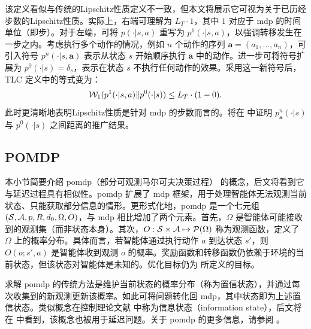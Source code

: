 该定义看似与传统的Lipschitz性质定义不一致，但本文将展示它可视为关于已历经步数的Lipschitz性质。实际上，右端可理解为 $L_T\cdot 1$，其中 $1$ 对应于 \gls{mdp} 的时间单位（即步）。对于左端，可将 $p(\cdot\vert s,a)$ 重写为 $p^1(\cdot\vert s,a)$，以强调转移发生在一步之内。考虑执行多个动作的情况，例如 $n$ 个动作的序列 $\boldsymbol a=(a_1,\dots,a_n)$，可引入符号 $p^n(\cdot\vert s,\boldsymbol a)$ 表示从状态 $s$ 开始顺序执行 $\boldsymbol a$ 中的动作。进一步可将符号扩展为 $p^0(\cdot\vert s)=\delta_s$，表示在状态 $s$ 不执行任何动作的效果。采用这一新符号后，TLC 定义中的等式变为：
\begin{align*}
    \wassersteindistance[1](p^1(\cdot\vert s,a)\Vert p^0(\cdot\vert s))\le L_T\cdot (1-0).
\end{align*}
此时更清晰地表明Lipschitz性质是针对 \gls{mdp} 的步数而言的。将在  中证明 $p_{\boldsymbol a}^n(\cdot\vert s)$ 与 $p^0(\cdot\vert s)$ 之间距离的推广结果。


\subsection{POMDP}
\label{subsec:pomdp}

本小节简要介绍 \gls{pomdp}（部分可观测马尔可夫决策过程）\cite{kaelbling1998planning} 的概念，后文将看到它与延迟过程具有相似性。\gls{pomdp} 扩展了 \gls{mdp} 框架，用于处理智能体无法观测当前状态、只能获取部分信息的情形。更形式化地，\gls{pomdp} 是一个七元组 $(\statespace,\actionspace, \transitionfunction, \rewardfunction, \initialstatedistribution, \Omega, O)$，与 \gls{mdp} 相比增加了两个元素。首先，$\Omega$ 是智能体可能接收到的观测集（而非状态本身）。其次，$O:\statespace\times\actionspace\mapsto \setofprobability(\Omega)$ 称为观测函数，定义了 $\Omega$ 上的概率分布。具体而言，若智能体通过执行动作 $a$ 到达状态 $s'$，则 $O(o; s',a)$ 是智能体收到观测 $o$ 的概率。奖励函数和转移函数仍依赖于环境的当前状态，但该状态对智能体是未知的。优化目标仍为  所定义的目标。

求解 \gls{pomdp} 的传统方法是维护当前状态的概率分布（称为置信状态），并通过每次收集到的新观测更新该概率。如此可将问题转化回 \gls{mdp}，其中状态即为上述置信状态。类似概念在控制理论文献 \cite{kumar2015stochastic} 中称为信息状态（information state），后文将在  中看到，该概念也被用于延迟问题。关于 \gls{pomdp} 的更多信息，请参阅 \cite{hauskrecht2000value, spaan2012partially}。
